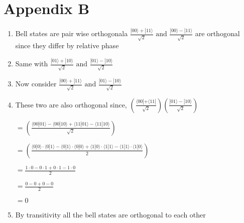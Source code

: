 \documentclass[a4paper,12pt]{amsbook}
\newcommand{\0}{{$|0\rangle$}}
\newcommand{\1}{{$|1\rangle$}}
\begin{document}
\begin{enumerate}

\end{enumerate}


\section{Appendix B}
\begin{enumerate}
    \item Bell states are pair wise orthogonal\footnotemark[6]a
$\frac{|00\rangle + |11\rangle}{\sqrt{2}} \text{ and }
\frac{|00\rangle - |11\rangle}{\sqrt{2}}$ 
are orthogonal since they differ by relative phase

    \item Same with 
$\frac{|01\rangle + |10\rangle}{\sqrt{2}} \text{ and }
\frac{|01\rangle - |10\rangle}{\sqrt{2}}$

    \item Now consider 
$\frac{|00\rangle + |11\rangle}{\sqrt{2}} \text{ and }
\frac{|01\rangle - |10\rangle}{\sqrt{2}}$

    \item These two are also orthogonal since,
$(\frac{\langle00|+ \langle11|}{\sqrt{2}}) 
(\frac{|01\rangle - |10\rangle}{\sqrt{2}})$

$ = (\frac{\langle00|01\rangle - \langle00|10\rangle +  \langle11|01\rangle - \langle11|10\rangle}{\sqrt{2}})$

$ = (\frac{\langle0|0\rangle \cdot \langle0|1\rangle - \langle0|1\rangle \cdot \langle0|0\rangle + \langle1|0\rangle \cdot \langle1|1\rangle  - \langle1|1\rangle \cdot \langle1|0\rangle }{2}) $

$ = \frac{1\cdot0 - 0\cdot1 + 0\cdot1 - 1\cdot0}{2}$

$ = \frac{0 - 0 + 0 - 0}{2}$

$= 0$

    \item By transitivity all the bell states are orthogonal to each other

\end{enumerate}
\end{document}

